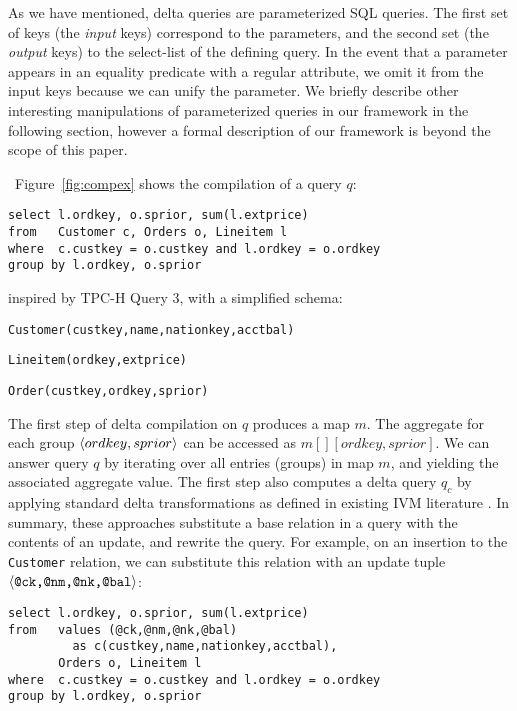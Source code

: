 As we have mentioned, delta queries are parameterized SQL queries. The first set
of keys (the \textit{input} keys) correspond to the parameters, and the second
set (the \textit{output} keys) to the select-list of the defining query. In the
event that a parameter appears in an equality predicate with a regular
attribute, we omit it from the input keys because we can unify the parameter. We
briefly describe other interesting manipulations of parameterized queries in our
framework in the following section, however a formal description of our
framework is beyond the scope of this paper.

~Figure~\ref{fig:compex} shows the compilation of a query
$q$:

{\footnotesize\begin{verbatim}
select l.ordkey, o.sprior, sum(l.extprice)
from   Customer c, Orders o, Lineitem l
where  c.custkey = o.custkey and l.ordkey = o.ordkey
group by l.ordkey, o.sprior
\end{verbatim}}


\noindent inspired by TPC-H Query 3, with a simplified schema:

\vspace{1mm}
\texttt{Customer(custkey,name,nationkey,acctbal)}

\texttt{Lineitem(ordkey,extprice)}

\texttt{Order(custkey,ordkey,sprior)}

\vspace{1mm}
\noindent 
The first step of delta compilation on $q$ produces a map $m$. The aggregate for
each group ${\langle ordkey,sprior\rangle}$ can be accessed as $m[][ordkey,sprior]$. We
can answer query $q$ by iterating over all entries (groups) in map $m$, and
yielding the associated aggregate value.
The first step also computes a delta query $q_{c}$ by applying standard
delta transformations as defined in existing IVM literature
\cite{griffin-sigmod:95,roussopoulos-tods:91,zhou-vldb:07,zhou-icde:07}. In
summary, these approaches substitute a base relation in a query with the
contents of an update, and rewrite the query. For example, on an insertion to
the {\tt Customer} relation, we can substitute this relation
with an update tuple ${\langle\mbox{{\tt @ck,@nm,@nk,@bal}}\rangle}$:

\pagebreak
\begin{verbatim}
select l.ordkey, o.sprior, sum(l.extprice)
from   values (@ck,@nm,@nk,@bal)
         as c(custkey,name,nationkey,acctbal),
       Orders o, Lineitem l
where  c.custkey = o.custkey and l.ordkey = o.ordkey
group by l.ordkey, o.sprior
\end{verbatim}

